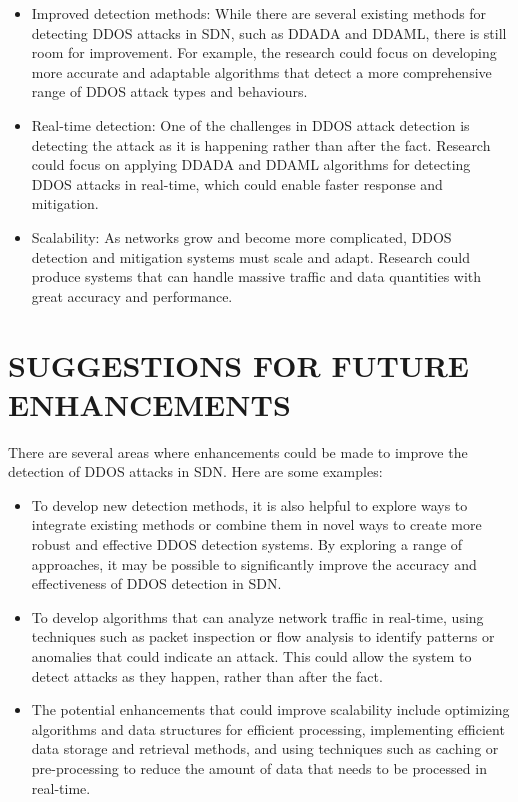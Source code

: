 \documentclass[12pt]{report}
\begin{document}
\begin{itemize}
    \item Improved detection methods:
    While there are several existing methods for detecting DDOS attacks in SDN, such as DDADA and DDAML, there is still room for improvement. For example, the research could focus on developing more accurate and adaptable algorithms that detect a more comprehensive range of DDOS attack types and behaviours.

    \item Real-time detection:
    One of the challenges in DDOS attack detection is detecting the attack as it is happening rather than after the fact. Research could focus on applying DDADA and DDAML algorithms for detecting DDOS attacks in real-time, which could enable faster response and mitigation.

    \item Scalability: 
    As networks grow and become more complicated, DDOS detection and mitigation systems must scale and adapt. Research could produce systems that can handle massive traffic and data quantities with great accuracy and performance.
    
\end{itemize}

\section{SUGGESTIONS FOR FUTURE ENHANCEMENTS}
There are several areas where enhancements could be made to improve the detection of DDOS attacks in SDN. Here are some examples:


\begin{itemize}
    \item To develop new detection methods, it is also helpful to explore ways to integrate existing methods or combine them in novel ways to create more robust and effective DDOS detection systems. By exploring a range of approaches, it may be possible to significantly improve the accuracy and effectiveness of DDOS detection in SDN.

    \item To develop algorithms that can analyze network traffic in real-time, using techniques such as packet inspection or flow analysis to identify patterns or anomalies that could indicate an attack. This could  allow the system to detect attacks as they happen, rather than after the fact.

    \item The potential enhancements that could improve scalability include optimizing algorithms and data structures for efficient processing, implementing efficient data storage and retrieval methods, and using techniques such as caching or pre-processing to reduce the amount of data that needs to be processed in real-time.
    
\end{itemize}
\end{document}
